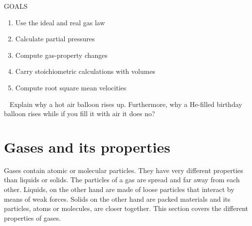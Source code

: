 \documentclass[main.tex]{subfiles}
\begin{document}
\begin{marginfigure}%
\begin{mytcbox}{GOALS}
\begin{enumerate}[label=\protect\circled{\color{white}\arabic*}]
\item Use the ideal and real gas law
\item Calculate partial pressures
\item Compute gas-property changes
\item Carry  stoichiometric calculations with volumes
\item Compute root square mean velocities
\end{enumerate}
\end{mytcbox}
\vspace{1cm}
\begin{tcolorbox}[enhanced,colback=red!5!white,colframe=black!50!red,boxrule=1pt,
  arc=0pt,outer arc=0pt,drop heavy lifted shadow]
\faGears\ 
 Explain why a hot air balloon rises up. Furthermore, why a He-filled birthday balloon rises while if you fill it with air it does no?
\end{tcolorbox}
\end{marginfigure}%


\section{Gases and its properties}
Gases contain atomic or molecular particles. They have very different properties than liquids or solids. The particles of a gas are spread and far away from each other. Liquids, on the other hand are made of loose particles that interact by means of weak forces. Solids on the other hand are packed materials and its particles, atoms or molecules, are closer together. This section covers the different properties of gases.

\end{document}
